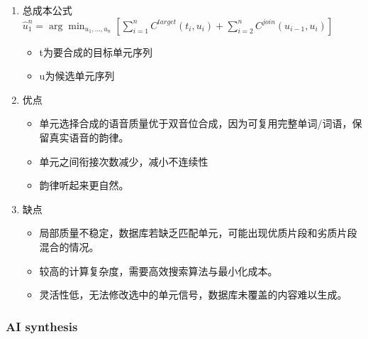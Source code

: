 \documentclass[UTF8]{ctexart}
\begin{document}
\begin{itemize}
\begin{enumerate}
        \item 总成本公式
        $ \hat{u}_1^n = \arg\min_{u_1, \dots, u_n} \left[ \sum_{i=1}^n C^{target}(t_i, u_i) + \sum_{i=2}^n C^{join}(u_{i-1}, u_i) \right]$
        \begin{itemize}
            \item t为要合成的目标单元序列
            \item u为候选单元序列
        \end{itemize}
        \item 优点
        \begin{itemize}
            \item 单元选择合成的语音质量优于双音位合成，因为可复用完整单词/词语，保留真实语音的韵律。
            \item 单元之间衔接次数减少，减小不连续性
            \item 韵律听起来更自然。
        \end{itemize}
        \item 缺点
        \begin{itemize}
            \item 局部质量不稳定，数据库若缺乏匹配单元，可能出现优质片段和劣质片段混合的情况。
            \item 较高的计算复杂度，需要高效搜索算法与最小化成本。
            \item 灵活性低，无法修改选中的单元信号，数据库未覆盖的内容难以生成。
        \end{itemize}
    \end{enumerate}

\end{itemize}


\subsubsection{AI synthesis}
\end{document}
